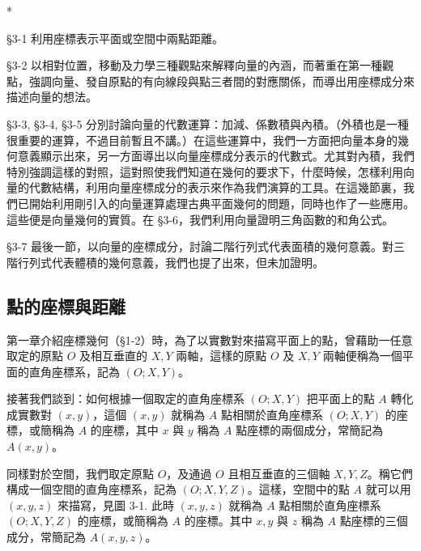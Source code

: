 \begin{center}
* \qquad\qquad * \qquad\qquad * \qquad\qquad * \qquad\qquad *
\end{center}

§3-1 利用座標表示平面或空間中兩點距離。

§3-2 以相對位置，移動及力學三種觀點來解釋向量的內涵，而著重在第一種觀點，強調向量、發自原點的有向線段與點三者間的對應關係，而導出用座標成分來描述向量的想法。

§3-3, §3-4, §3-5 分別討論向量的代數運算：加減、係數積與內積。（外積也是一種很重要的運算，不過目前暫且不講。）在這些運算中，我們一方面把向量本身的幾何意義顯示出來，另一方面導出以向量座標成分表示的代數式。尤其對內積，我們特別強調這樣的對照，這對照使我們知道在幾何的要求下，什麼時候，怎樣利用向量的代數結構，利用向量座標成分的表示來作為我們演算的工具。在這幾節裏，我們已開始利用剛引入的向量運算處理古典平面幾何的問題，同時也作了一些應用。這些便是向量幾何的實質。在 §3-6，我們利用向量證明三角函數的和角公式。

§3-7 最後一節，以向量的座標成分，討論二階行列式代表面積的幾何意義。對三階行列式代表體積的幾何意義，我們也提了出來，但未加證明。

\subsection{點的座標與距離}
\label{sec:b3-3-1}

第一章介紹座標幾何（§1-2）時，為了以實數對來描寫平面上的點，曾藉助一任意取定的原點 $O$ 及相互垂直的 $X, Y$ 兩軸，這樣的原點 $O$ 及 $X, Y$ 兩軸便稱為一個平面的直角座標系，記為 $(O; X, Y)$。

接著我們談到：如何根據一個取定的直角座標系 $(O; X, Y)$ 把平面上的點 $A$ 轉化成實數對 $(x, y)$，這個 $(x, y)$ 就稱為 $A$ 點相關於直角座標系 $(O; X, Y)$ 的座標，或簡稱為 $A$ 的座標，其中 $x$ 與 $y$ 稱為 $A$ 點座標的兩個成分，常簡記為 $A(x, y)$。

同樣對於空間，我們取定原點 $O$，及通過 $O$ 且相互垂直的三個軸 $X, Y, Z$。稱它們構成一個空間的直角座標系，記為 $(O; X, Y, Z)$。這樣，空間中的點 $A$ 就可以用 $(x, y, z)$ 來描寫，見圖 3-1. 此時 $(x, y, z)$ 就稱為 $A$ 點相關於直角座標系 $(O; X, Y, Z)$ 的座標，或簡稱為 $A$ 的座標。其中 $x, y$ 與 $z$ 稱為 $A$ 點座標的三個成分，常簡記為 $A(x, y, z)$。

